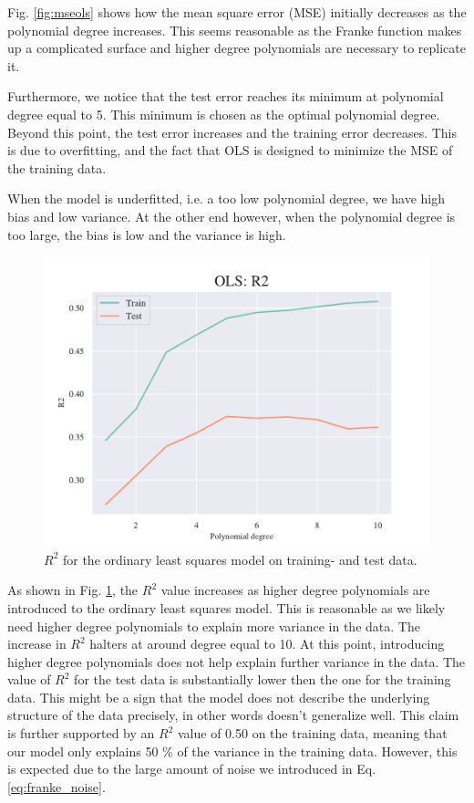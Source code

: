 Fig. \ref{fig:mseols} shows how the mean square error (MSE) initially decreases as the polynomial degree increases. This seems reasonable as the Franke function makes up a complicated surface and higher degree polynomials are necessary to replicate it. 

Furthermore, we notice that the test error reaches its minimum at polynomial degree equal to 5. 
This minimum is chosen as the optimal polynomial degree. 
Beyond this point, the test error increases and the training error decreases.
This is due to overfitting, and the fact that OLS is designed to minimize the MSE of the training data. 

When the model is underfitted, i.e. a too low polynomial degree, we have high bias and low variance. At the other end however, when the polynomial degree is too large, the bias is low and the variance is high. 

\begin{figure}[h!]
    \centering
    \includegraphics[width=1\linewidth]{project_1/figures/figures_in_report/OLS_R2_Franke_Noise.pdf}
    \caption{$R^2$ for the ordinary least squares model on training- and test data.}
    \label{fig:r2ols}
\end{figure}

As shown in Fig. \ref{fig:r2ols}, the $R^2$ value increases as higher degree polynomials are introduced to the ordinary least squares model. 
This is reasonable as we likely need higher degree polynomials to explain more variance in the data. The increase in $R^2$ halters at around degree equal to 10. 
At this point, introducing higher degree polynomials does not help explain further variance in the data. 
The value of $R^2$ for the test data is substantially lower then the one for the training data. 
This might be a sign that the model does not describe the underlying structure of the data precisely, in other words doesn't generalize well. 
This claim is further supported by an $R^2$ value of 0.50 on the training data, meaning that our model only explains 50 \% of the variance in the training data.
However, this is expected due to the large amount of noise we introduced in Eq. \ref{eq:franke_noise}.

